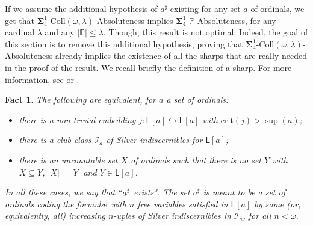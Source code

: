 \documentclass[10pt]{amsart}
\renewcommand\le\leqslant
\newtheorem{fact}[theorem]{Fact}
\theoremstyle{definition}
\begin{document}
If we assume the additional hypothesis of $a^\sharp$ existing for any set $a$ of ordinals, we get that $\boldsymbol\Sigma^1_4$-$\mathrm{Coll}(\omega,\lambda)$-Absoluteness implies $\boldsymbol\Sigma^1_4$-$\mathbb P$-Absoluteness, for any cardinal $\lambda$ and any $|\mathbb P|\le\lambda$. Though, this result is not optimal. Indeed, the goal of this section is to remove this additional hypothesis, proving that $\boldsymbol\Sigma^1_4$-$\mathrm{Coll}(\omega,\lambda)$-Absoluteness already implies the existence of all the sharps that are really needed in the proof of the result. We recall briefly the definition of a sharp. For more information, see \cite[Section 9]{Kanamori} or \cite{SoloNon}.

\begin{fact}\label{sharpsdef}
    The following are equivalent, for $a$ a set of ordinals:
    \begin{itemize}
        \item there is a non-trivial embedding $j:\mathsf L[a]\hookrightarrow\mathsf L[a]$ with $\mathrm{crit}(j)>\sup(a)$;
        \item there is a club class $\mathcal I_a$ of Silver indiscernibles for $\mathsf L[a]$;
        \item there is an uncountable set $X$ of ordinals such that there is no set $Y$ with $X\subseteq Y$, $|X|=|Y|$ and $Y\in\mathsf L[a]$.
    \end{itemize}
    In all these cases, we say that $``a^\sharp$ exists". The set $a^\sharp$ is meant to be a set of ordinals coding the formul\ae\ with $n$ free variables satisfied in $\mathsf L[a]$ by some (or, equivalently, all) increasing $n$-uples of Silver indiscernibles in $\mathcal I_a$, for all $n<\omega$.
\end{fact}




\end{document}
